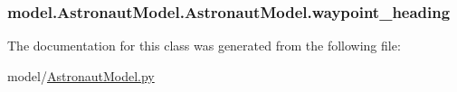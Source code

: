 \subsubsection[{waypoint\+\_\+heading}]{\setlength{\rightskip}{0pt plus 5cm}model.\+Astronaut\+Model.\+Astronaut\+Model.\+waypoint\+\_\+heading}\label{classmodel_1_1AstronautModel_1_1AstronautModel_a11d42f7b1a897c25839765d6c4c550a3}


The documentation for this class was generated from the following file\+:\begin{DoxyCompactItemize}
\item 
model/\hyperlink{AstronautModel_8py}{Astronaut\+Model.\+py}\end{DoxyCompactItemize}
